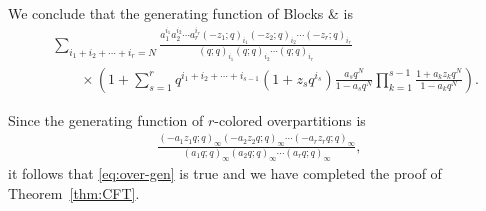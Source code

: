 \documentclass[12pt,reqno]{amsart}
\numberwithin{equation}{section}
\theoremstyle{plain}
\theoremstyle{definition}
\newcommand{\bl}[1]{\uppercase\expandafter{\romannumeral#1}}
\begin{document}
We conclude that the generating function of Blocks \bl{2} \& \bl{3} is
\begin{align}
&\sum_{i_{1}+i_{2}+\cdots+i_{r}=N}\frac{a_{1}^{i_{1}}a_{2}^{i_{2}}\cdots a_{r}^{i_{r}}(-z_1;q)_{i_{1}}(-z_2;q)_{i_{2}}\cdots(-z_r;q)_{i_{r}}}{(q;q)_{i_{1}}(q;q)_{i_{2}}\cdots(q;q)_{i_{r}}}\nonumber\\
&\quad\quad\times \left(1+\sum_{s=1}^{r}q^{i_1+i_2+\cdots+i_{s-1}}\left(1+z_s q^{i_s}\right) \frac{a_s q^N}{1-a_s q^N}  \prod_{k=1}^{s-1} \frac{1+a_k z_k q^N}{1-a_k q^N}\right).
\end{align}

Since the generating function of $r$-colored overpartitions is
\begin{align}
\frac{(-a_{1} z_1 q;q)_{\infty}(-a_{2} z_2 q;q)_{\infty}\cdots(-a_{r} z_r q;q)_{\infty}}{(a_{1}q;q)_{\infty}(a_{2}q;q)_{\infty}\cdots(a_{r}q;q)_{\infty}},
\end{align}
it follows that \eqref{eq:over-gen} is true and we have completed the proof of Theorem~\ref{thm:CFT}.
\end{document}
